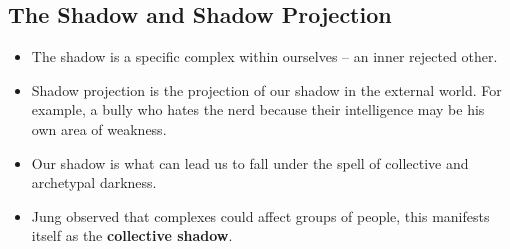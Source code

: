 \documentclass[twocolumn]{article}
\theoremstyle{plain}
\begin{document}
\subsection{The Shadow and Shadow Projection}

\begin{itemize}
    \item The shadow is a specific complex within ourselves -- an inner rejected other.
    \item Shadow projection is the projection of our shadow in the external world. For example, a bully who hates the nerd because their intelligence may be his own area of weakness.
    \item Our shadow is what can lead us to fall under the spell of collective and archetypal darkness.
    \item Jung observed that complexes could affect groups of people, this manifests itself as the \textbf{collective shadow}.
\end{itemize}
\end{document}
